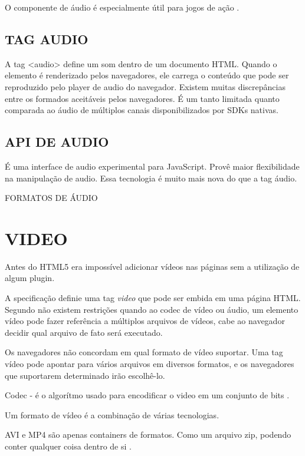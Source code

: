\documentclass[
12pt,
a4paper,
portuges,
draft
]{report}
\begin{document}
O componente de áudio é especialmente útil para jogos de ação \autocite{browserGamesTechnologyAndFuture}.

\subsection{TAG AUDIO}

A tag <audio> define um som dentro de um documento HTML. Quando o
elemento é renderizado pelos navegadores, ele carrega o conteúdo
que pode ser reproduzido pelo player de audio do navegador. Existem
muitas discrepâncias entre os formados aceitáveis pelos navegadores.
É um tanto limitada quanto comparada ao áudio de múltiplos canais
disponibilizados por SDKs nativas.

\subsection{API DE AUDIO}

É uma interface de audio experimental para JavaScript. Provê maior
flexibilidade na manipulação de audio. Essa tecnologia é muito mais
nova do que a tag áudio.

FORMATOS DE ÁUDIO


\section{VIDEO}

Antes do HTML5 era impossível adicionar vídeos nas páginas sem a utilização de algum plugin.

A specificação definie uma tag \textit{video} que pode ser embida em uma página HTML. Segundo \cite{diveIntohtml} não existem restrições quando ao codec de vídeo ou áudio, um elemento vídeo pode fazer referência a múltiplos arquivos de vídeos, cabe ao navegador decidir qual arquivo de fato será executado.

Os navegadores não concordam em qual formato de vídeo suportar.
Uma tag vídeo pode apontar para vários arquivos em diversos formatos, e os navegadores que suportarem determinado irão escolhê-lo.

Codec - é o algorítmo usado para encodificar o video em um conjunto de bits \cite{diveIntohtml}.

Um formato de vídeo é a combinação de várias tecnologias.


AVI e MP4 são apenas containers de formatos. Como um arquivo zip, podendo conter qualquer coisa dentro de si \autocite{diveIntohtml}.
\end{document}
